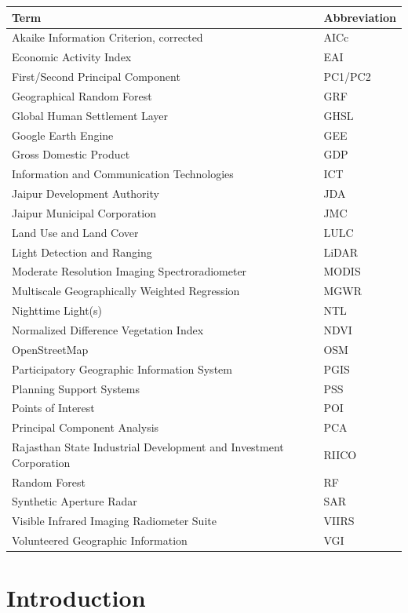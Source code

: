\documentclass[
  12pt,
  oneside]{book}
\begin{document}
\begin{longtable}{ll}
\toprule
\textbf{Term} & \textbf{Abbreviation}\\
\midrule
Akaike Information Criterion, corrected & AICc\\
Economic Activity Index & EAI\\
First/Second Principal Component & PC1/PC2\\
Geographical Random Forest & GRF\\
Global Human Settlement Layer & GHSL\\
\addlinespace
Google Earth Engine & GEE\\
Gross Domestic Product & GDP\\
Information and Communication Technologies & ICT\\
Jaipur Development Authority & JDA\\
Jaipur Municipal Corporation & JMC\\
\addlinespace
Land Use and Land Cover & LULC\\
Light Detection and Ranging & LiDAR\\
Moderate Resolution Imaging Spectroradiometer & MODIS\\
Multiscale Geographically Weighted Regression & MGWR\\
Nighttime Light(s) & NTL\\
\addlinespace
Normalized Difference Vegetation Index & NDVI\\
OpenStreetMap & OSM\\
Participatory Geographic Information System & PGIS\\
Planning Support Systems & PSS\\
Points of Interest & POI\\
\addlinespace
Principal Component Analysis & PCA\\
Rajasthan State Industrial Development and Investment Corporation & RIICO\\
Random Forest & RF\\
Synthetic Aperture Radar & SAR\\
Visible Infrared Imaging Radiometer Suite & VIIRS\\
\addlinespace
Volunteered Geographic Information & VGI\\
\bottomrule
\end{longtable}

\chapter{Introduction}\label{introduction}
\end{document}
